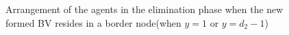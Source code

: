 \begin{itemize}
\begin{figure} [H]
      \hspace{1in} 
  \caption{Arrangement of the agents in the  elimination phase when the new formed BV resides in a border node(when $y=1$ or $y=d_2-1$)} 
  \label{fig:casethree} %
\end{figure}


\end{itemize}
